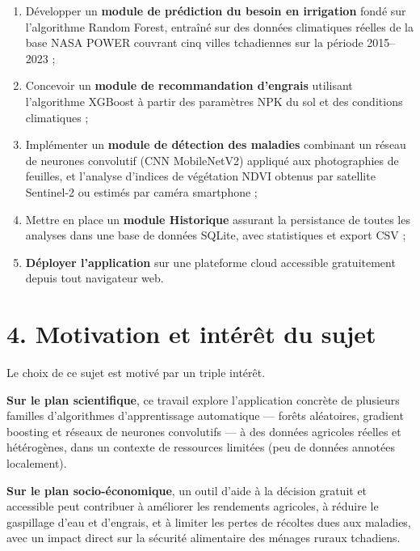 \begin{enumerate}[leftmargin=1.2cm]
	\item Développer un \textbf{module de prédiction du besoin en
		irrigation} fondé sur l'algorithme Random Forest, entraîné
	sur des données climatiques réelles de la base NASA POWER
	couvrant cinq villes tchadiennes sur la période 2015--2023 ;
	\item Concevoir un \textbf{module de recommandation d'engrais}
	utilisant l'algorithme XGBoost à partir des paramètres NPK
	du sol et des conditions climatiques ;
	\item Implémenter un \textbf{module de détection des maladies}
	combinant un réseau de neurones convolutif (CNN MobileNetV2)
	appliqué aux photographies de feuilles, et l'analyse
	d'indices de végétation NDVI obtenus par satellite
	Sentinel-2 ou estimés par caméra smartphone ;
	\item Mettre en place un \textbf{module Historique} assurant la
	persistance de toutes les analyses dans une base de données
	SQLite, avec statistiques et export CSV ;
	\item \textbf{Déployer l'application} sur une plateforme cloud
	accessible gratuitement depuis tout navigateur web.
\end{enumerate}

\section*{4. Motivation et intérêt du sujet}

Le choix de ce sujet est motivé par un triple intérêt.

\medskip

\textbf{Sur le plan scientifique}, ce travail explore l'application
concrète de plusieurs familles d'algorithmes d'apprentissage
automatique --- forêts aléatoires, gradient boosting et réseaux de
neurones convolutifs --- à des données agricoles réelles et
hétérogènes, dans un contexte de ressources limitées (peu de
données annotées localement).

\medskip

\textbf{Sur le plan socio-économique}, un outil d'aide à la décision
gratuit et accessible peut contribuer à améliorer les rendements
agricoles, à réduire le gaspillage d'eau et d'engrais, et à limiter
les pertes de récoltes dues aux maladies, avec un impact direct sur
la sécurité alimentaire des ménages ruraux tchadiens.

